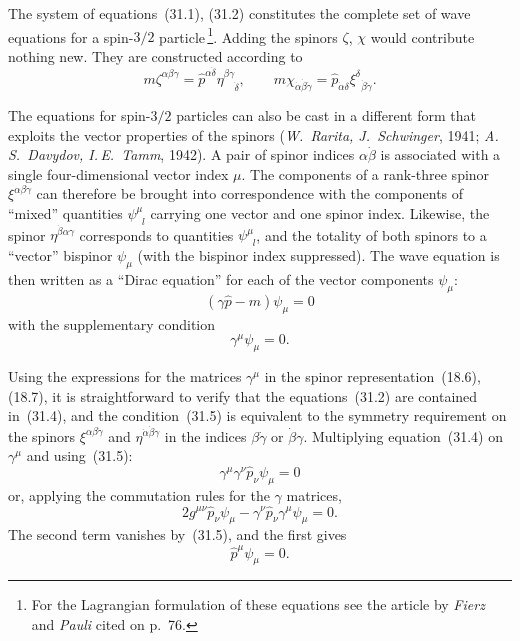 The system of equations~(31.1), (31.2) constitutes the complete set of wave equations for a spin-$3/2$ particle\,\footnote{For the Lagrangian formulation of these equations see the article by \emph{Fierz} and \emph{Pauli} cited on p.~76.}. Adding the spinors $\zeta$, $\chi$ would contribute nothing new. They are constructed according to
\[
m\zeta^{\alpha\beta\gamma} = \widehat p^{\alpha\dot\delta}\eta^{\beta\gamma}_{\;\;\;\;\dot\delta},\qquad m\chi_{\dot\alpha\dot\beta\dot\gamma} = \widehat p_{\dot\alpha\delta}\xi^{\delta}_{\;\;\dot\beta\dot\gamma}.
\]

The equations for spin-$3/2$ particles can also be cast in a different form that exploits the vector properties of the spinors (\emph{W.~Rarita, J.~Schwinger}, 1941; \emph{A.\,S.~Davydov, I.\,E.~Tamm}, 1942). A pair of spinor indices $\alpha\dot\beta$ is associated with a single four-dimensional vector index $\mu$. The components of a rank-three spinor $\xi^{\alpha\beta\dot\gamma}$ can therefore be brought into correspondence with the components of ``mixed'' quantities $\psi^\mu_{\;\;l}$ carrying one vector and one spinor index. Likewise, the spinor $\eta^{\dot\beta\alpha\gamma}$ corresponds to quantities $\psi^\mu_{\;\;l}$, and the totality of both spinors to a ``vector'' bispinor $\psi_\mu$ (with the bispinor index suppressed). The wave equation is then written as a ``Dirac equation'' for each of the vector components $\psi_\mu$:
\begin{equation}
(\gamma\widehat p - m)\psi_\mu = 0
\tag{31.4}
\end{equation}
with the supplementary condition
\begin{equation}
\gamma^\mu\psi_\mu = 0.
\tag{31.5}
\end{equation}

Using the expressions for the matrices $\gamma^\mu$ in the spinor representation~(18.6), (18.7), it is straightforward to verify that the equations~(31.2) are contained in~(31.4), and the condition~(31.5) is equivalent to the symmetry requirement on the spinors $\xi^{\alpha\beta\dot\gamma}$ and $\eta^{\dot\alpha\dot\beta\gamma}$ in the indices $\beta\dot\gamma$ or $\dot\beta\gamma$. Multiplying equation~(31.4) on $\gamma^\mu$ and using~(31.5):
\[
\gamma^\mu\gamma^\nu\widehat p_\nu\psi_\mu = 0
\]
or, applying the commutation rules for the $\gamma$ matrices,
\begin{equation}
2g^{\mu\nu}\widehat p_\nu\psi_\mu - \gamma^\nu\widehat p_\nu\gamma^\mu\psi_\mu = 0.
\tag{31.6}
\end{equation}
The second term vanishes by~(31.5), and the first gives
\begin{equation}
\widehat p^\mu\psi_\mu = 0.
\tag{31.7}
\end{equation}

